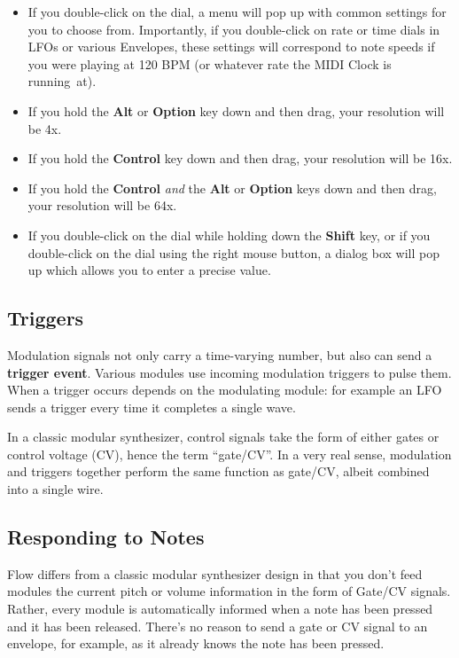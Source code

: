 \documentclass{article}
\newcommand\name{Flow}
\begin{document}
\begin{itemize}
\item If you double-click on the dial, a menu will pop up with common settings for you to choose from.  Importantly, if you double-click on rate or time dials in LFOs or various Envelopes, these settings will correspond to note speeds if you were playing at 120 BPM (or whatever rate the MIDI Clock is running~at).
\item If you hold the {\bf Alt} or {\bf Option} key down and then drag, your resolution will be 4x.
\item If you hold the {\bf Control} key down and then drag, your resolution will be 16x.
\item If you hold the {\bf Control} {\it and} the {\bf Alt} or {\bf Option} keys down and then drag, your resolution will be 64x.
\item If you double-click on the dial while holding down the {\bf Shift} key, or if you double-click on the dial using the right mouse button, a dialog box will pop up which allows you to enter a precise value.
\end{itemize}

\subsection{Triggers}

Modulation signals not only carry a time-varying number, but also can send a {\bf trigger event}.  Various modules use incoming modulation triggers to pulse them.  When a trigger occurs depends on the modulating module: for example an LFO sends a trigger every time it completes a single wave. 

In a classic modular synthesizer, control signals take the form of either gates or control voltage (CV), hence the term ``gate/CV''.  In a very real sense, modulation and triggers together perform the same function as gate/CV, albeit combined into a single wire.

\subsection{Responding to Notes} {\name} differs from a classic modular synthesizer design in that you don't feed modules the current pitch or volume information in the form of Gate/CV signals. Rather, every module is automatically informed when a note has been pressed and it has been released.  There's no reason to send a gate or CV signal to an envelope, for example, as it already knows the note has been pressed.
\end{document}
